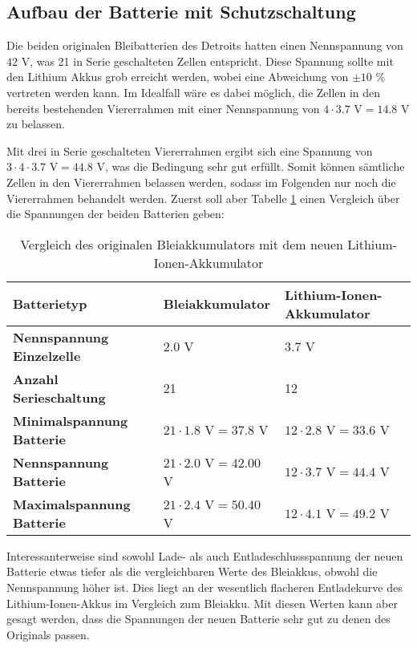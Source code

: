 \subsection{Aufbau der Batterie mit Schutzschaltung}
Die beiden originalen Bleibatterien des Detroits hatten einen Nennspannung von $42$ V, was 21 in Serie geschalteten Zellen entspricht. Diese Spannung sollte mit den Lithium Akkus grob erreicht werden, wobei eine Abweichung von $\pm 10$ \% vertreten werden kann. Im Idealfall wäre es dabei möglich, die Zellen in den bereits bestehenden Viererrahmen mit einer Nennspannung von $4\cdot 3.7$ V$=14.8$ V zu belassen.

Mit drei in Serie geschalteten Viererrahmen ergibt sich eine Spannung von $3\cdot 4\cdot 3.7$ V$=44.8$ V, was die Bedingung sehr gut erfüllt. Somit können sämtliche Zellen in den Viererrahmen belassen werden, sodass im Folgenden nur noch die Viererrahmen behandelt werden. Zuerst soll aber Tabelle \ref{tab:bat_vergl} einen Vergleich über die Spannungen der beiden Batterien geben:

\begin{table}[h]
\centering
\begin{tabular}{|l|l|l|}
\hline
\textbf{Batterietyp}              & \textbf{Bleiakkumulator} & \textbf{Lithium-Ionen-Akkumulator} \\ \hline
\textbf{Nennspannung Einzelzelle} & $2.0$ V                            & $3.7$ V                                    \\ \hline
\textbf{Anzahl Serieschaltung}    & 21                                  & 12                                          \\ \hline
\textbf{Minimalspannung Batterie} & $21\cdot1.8$ V$=37.8$ V           & $12\cdot2.8$ V$=33.6$ V                     \\ \hline
\textbf{Nennspannung Batterie}    & $21\cdot2.0$ V$=42.00$ V           & $12\cdot3.7$ V$=44.4$ V                    \\ \hline
\textbf{Maximalspannung Batterie} & $21\cdot2.4$ V$=50.40$ V            & $12\cdot4.1$ V$=49.2$ V                     \\ \hline
\end{tabular}
\caption{Vergleich des originalen Bleiakkumulators mit dem neuen Lithium-Ionen-Akkumulator}
\label{tab:bat_vergl}
\end{table}

Interessanterweise sind sowohl Lade- als auch Entladeschlussspannung der neuen Batterie etwas tiefer als die vergleichbaren Werte des Bleiakkus, obwohl die Nennspannung höher ist. Dies liegt an der wesentlich flacheren Entladekurve des Lithium-Ionen-Akkus im Vergleich zum Bleiakku. Mit diesen Werten kann aber gesagt werden, dass die Spannungen der neuen Batterie sehr gut zu denen des Originals passen.

